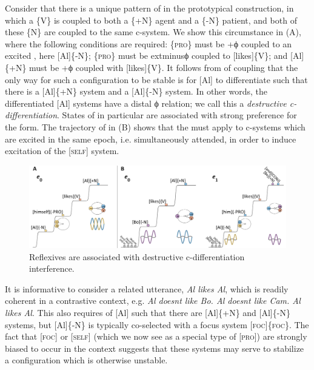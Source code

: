   Consider that there is a unique pattern of  in the prototypical  construction, in which a \{V\} is coupled to both a \{+N\} agent and a \{-N\} patient, and both of these \{N\} are coupled to the same c-system. We show this circumstance in {}(A), where the following conditions are required: \{\textsc{pro}\} must be +ϕ coupled to an excited , here [Al]\{-N\}; \{\textsc{pro}\} must be 	extminus{}ϕ coupled to [likes]\{V\}; and [Al]\{+N\} must be +ϕ coupled with [likes]\{V\}. It follows from  of coupling that the only way for such a configuration to be stable is for [Al] to differentiate such that there is a [Al]\{+N\} system and a [Al]\{-N\} system. In other words, the differentiated [Al] systems have a distal ϕ relation; we call this a \textit{destructive c-dif\-fer\-en\-ti\-a\-tion}. States of  in particular are associated with strong preference for the  form. The trajectory of  in {}(B) shows that the  must apply to c-systems which are excited in the same epoch, i.e. simultaneously attended, in order to induce excitation of the [\textsc{self}] system. 

\ea\label{ex:7:15}
 \label{ex:7:15a} 
  \label{ex:7:15b}
\z
\z
  
\begin{figure}
\includegraphics[width=\textwidth]{figures/Tilsen-img156.png}
\caption{Reflexives are associated with destructive c-dif\-fer\-en\-ti\-a\-tion interference.}
\label{fig:7:12}
\end{figure}
 

  It is informative to consider a related utterance, \textit{Al likes Al}, which is readily coherent in a contrastive context, e.g. \textit{Al doesnt like Bo. Al doesnt like Cam. Al likes Al}. This also requires  of [Al] such that there are [Al]\{+N\} and [Al]\{-N\} systems, but [Al]\{-N\} is typically co-selected with a focus system [\textsc{foc}]\{\textsc{foc}\}. The fact that [\textsc{foc}] or [\textsc{self}] (which we now see as a special type of [\textsc{pro}]) are strongly biased to occur in the  context suggests that these systems may serve to stabilize a configuration which is otherwise unstable.

